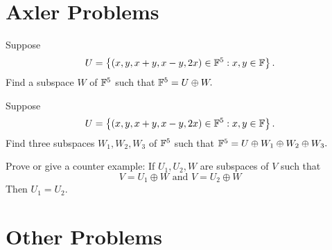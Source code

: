 \documentclass[answers]{exam}
\begin{document}
\section{Axler Problems}
\begin{questions}
    \question Suppose
    \[  
        U = \left\{\left(x,y,x+y,x-y,2x\right)\in\mathbb{F}^5:x,y\in\mathbb{F}\right\}.
    \]
    Find a subspace $W$ of $\mathbb{F}^5$ such that $\mathbb{F}^5 = U\oplus W.$

    \question Suppose
    \[  
        U = \left\{\left(x,y,x+y,x-y,2x\right)\in\mathbb{F}^5:x,y\in\mathbb{F}\right\}.
    \]
    Find three subspaces $W_1,W_2,W_3$ of $\mathbb{F}^5$ such that $\mathbb{F}^5 = U\oplus W_1\oplus W_2\oplus W_3.$

    \question Prove or give a counter example: If $U_1,U_2,W$ are subspaces of $V$ such that
    \[
        V = U_1\oplus W \text{ and } V = U_2\oplus W
    \]
    Then $U_1 = U_2$.
\end{questions}

\section{Other Problems}
\end{document}
